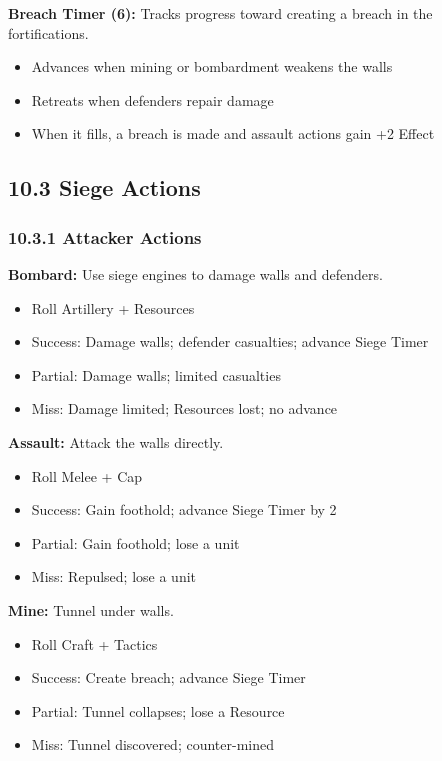 \documentclass[11pt]{article}
\begin{document}
\textbf{Breach Timer (6):} Tracks progress toward creating a breach in the fortifications.
\begin{itemize}
  \item Advances when mining or bombardment weakens the walls
  \item Retreats when defenders repair damage
  \item When it fills, a breach is made and assault actions gain +2 Effect
\end{itemize}

\subsection{10.3 Siege Actions}

\subsubsection{10.3.1 Attacker Actions}

\textbf{Bombard:} Use siege engines to damage walls and defenders.
\begin{itemize}
  \item Roll Artillery + Resources
  \item Success: Damage walls; defender casualties; advance Siege Timer
  \item Partial: Damage walls; limited casualties
  \item Miss: Damage limited; Resources lost; no advance
\end{itemize}

\textbf{Assault:} Attack the walls directly.
\begin{itemize}
  \item Roll Melee + Cap
  \item Success: Gain foothold; advance Siege Timer by 2
  \item Partial: Gain foothold; lose a unit
  \item Miss: Repulsed; lose a unit
\end{itemize}

\textbf{Mine:} Tunnel under walls.
\begin{itemize}
  \item Roll Craft + Tactics
  \item Success: Create breach; advance Siege Timer
  \item Partial: Tunnel collapses; lose a Resource
  \item Miss: Tunnel discovered; counter-mined
\end{itemize}
\end{document}
